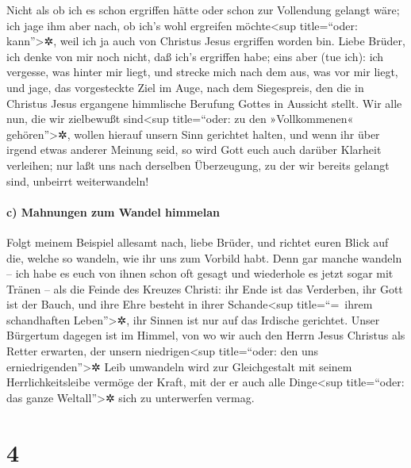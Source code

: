  Nicht als ob ich es schon ergriffen hätte oder schon zur
Vollendung gelangt wäre; ich jage ihm aber nach, ob ich's wohl ergreifen
möchte\textless sup title=``oder: kann''\textgreater✲, weil ich ja auch
von Christus Jesus ergriffen worden bin.  Liebe Brüder,
ich denke von mir noch nicht, daß ich's ergriffen habe; eins aber (tue
ich): ich vergesse, was hinter mir liegt, und strecke mich nach dem aus,
was vor mir liegt,  und jage, das vorgesteckte Ziel im
Auge, nach dem Siegespreis, den die in Christus Jesus ergangene
himmlische Berufung Gottes in Aussicht stellt.  Wir alle
nun, die wir zielbewußt sind\textless sup title=``oder: zu den
»Vollkommenen« gehören''\textgreater✲, wollen hierauf unsern Sinn
gerichtet halten, und wenn ihr über irgend etwas anderer Meinung seid,
so wird Gott euch auch darüber Klarheit verleihen;  nur
laßt uns nach derselben Überzeugung, zu der wir bereits gelangt sind,
unbeirrt weiterwandeln!

\hypertarget{c-mahnungen-zum-wandel-himmelan}{%
\paragraph{c) Mahnungen zum Wandel
himmelan}\label{c-mahnungen-zum-wandel-himmelan}}

 Folgt meinem Beispiel allesamt nach, liebe Brüder, und
richtet euren Blick auf die, welche so wandeln, wie ihr uns zum Vorbild
habt.  Denn gar manche wandeln -- ich habe es euch von
ihnen schon oft gesagt und wiederhole es jetzt sogar mit Tränen -- als
die Feinde des Kreuzes Christi:  ihr Ende ist das
Verderben, ihr Gott ist der Bauch, und ihre Ehre besteht in ihrer
Schande\textless sup title=``=~ihrem schandhaften Leben''\textgreater✲,
ihr Sinnen ist nur auf das Irdische gerichtet.  Unser
Bürgertum dagegen ist im Himmel, von wo wir auch den Herrn Jesus
Christus als Retter erwarten,  der unsern
niedrigen\textless sup title=``oder: den uns
erniedrigenden''\textgreater✲ Leib umwandeln wird zur Gleichgestalt mit
seinem Herrlichkeitsleibe vermöge der Kraft, mit der er auch alle
Dinge\textless sup title=``oder: das ganze Weltall''\textgreater✲ sich
zu unterwerfen vermag.

\hypertarget{section-3}{%
\section{4}\label{section-3}}

